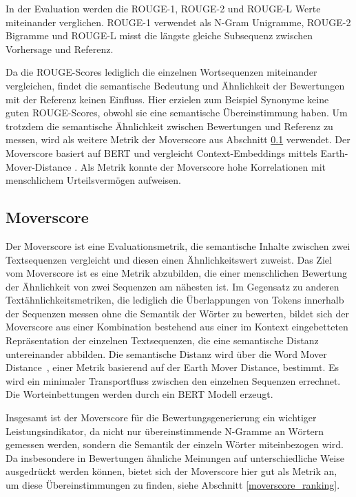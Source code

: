In der Evaluation werden die ROUGE-1, ROUGE-2 und ROUGE-L Werte miteinander verglichen.
ROUGE-1 verwendet als N-Gram Unigramme, ROUGE-2 Bigramme und ROUGE-L misst die längste gleiche Subsequenz zwischen Vorhersage und Referenz.

Da die ROUGE-Scores lediglich die einzelnen Wortsequenzen miteinander vergleichen, findet die semantische Bedeutung und Ähnlichkeit der Bewertungen mit der Referenz keinen Einfluss.
Hier erzielen zum Beispiel Synonyme keine guten ROUGE-Scores, obwohl sie eine semantische Übereinstimmung haben.
Um trotzdem die semantische Ähnlichkeit zwischen Bewertungen und Referenz zu messen, wird als weitere Metrik der Moverscore aus Abschnitt \ref{moverscore} verwendet.
Der Moverscore basiert auf BERT und vergleicht Context-Embeddings mittels Earth-Mover-Distance \citep{emd}. Als Metrik konnte der Moverscore hohe Korrelationen mit menschlichem Urteilsvermögen aufweisen.


\subsection{Moverscore}
\label{moverscore}
Der Moverscore \citep{moverscore_paper} ist eine Evaluationsmetrik, die semantische Inhalte zwischen zwei Textsequenzen vergleicht und diesen einen Ähnlichkeitswert zuweist.
Das Ziel vom Moverscore ist es eine Metrik abzubilden, die einer menschlichen Bewertung der Ähnlichkeit von zwei Sequenzen am nähesten ist. 
Im Gegensatz zu anderen Textähnlichkeitsmetriken, die lediglich die Überlappungen von Tokens innerhalb der Sequenzen messen ohne die Semantik der Wörter zu bewerten, 
bildet sich der Moverscore aus einer Kombination bestehend aus einer im Kontext eingebetteten Repräsentation der einzelnen Textsequenzen, die eine semantische Distanz untereinander abbilden.
Die semantische Distanz wird über die Word Mover Distance \citep{wordmoverdistance}, einer Metrik basierend auf der Earth Mover Distance, bestimmt. Es wird ein minimaler Transportfluss zwischen den einzelnen Sequenzen errechnet.
Die Worteinbettungen werden durch ein BERT Modell erzeugt.

Insgesamt ist der Moverscore für die Bewertungsgenerierung ein wichtiger Leistungsindikator, da nicht nur übereinstimmende N-Gramme an Wörtern gemessen werden, sondern die Semantik der einzeln Wörter miteinbezogen wird. 
Da insbesondere in Bewertungen ähnliche Meinungen auf unterschiedliche Weise ausgedrückt werden können, bietet sich der Moverscore hier gut als Metrik an, um diese Übereinstimmungen zu finden, siehe Abschnitt \ref{moverscore_ranking}.



